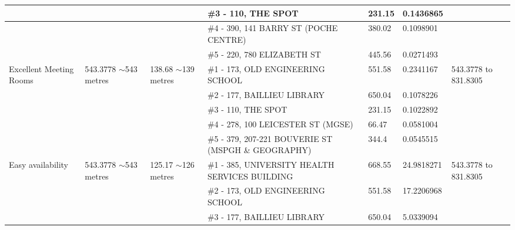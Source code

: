 \begin{table}[H]
{\begin{tabular}{|l|l|l|l|l|l|l|}
                        &                           &                          & \#3 - 110, THE SPOT                                     & 231.15        & 0.1436865       &                           \\ \hline
                        &                           &                          & \#4 - 390, 141 BARRY ST (POCHE CENTRE)                  & 380.02        & 0.1098901       &                           \\ \hline
                        &                           &                          & \#5 - 220, 780 ELIZABETH ST                             & 445.56        & 0.0271493       &                           \\ \hline
Excellent Meeting Rooms & 543.3778 $\sim$543 metres & 138.68 $\sim$139 metres  & \#1 - 173, OLD ENGINEERING SCHOOL                       & 551.58        & 0.2341167       & 543.3778 to 831.8305      \\ \hline
                        &                           &                          & \#2 - 177, BAILLIEU LIBRARY                             & 650.04        & 0.1078226       &                           \\ \hline
                        &                           &                          & \#3 - 110, THE SPOT                                     & 231.15        & 0.1022892       &                           \\ \hline
                        &                           &                          & \#4 - 278, 100 LEICESTER ST (MGSE)                      & 66.47         & 0.0581004       &                           \\ \hline
                        &                           &                          & \#5 - 379, 207-221 BOUVERIE ST (MSPGH \& GEOGRAPHY)     & 344.4         & 0.0545515       &                           \\ \hline
Easy availability       & 543.3778 $\sim$543 metres & 125.17 $\sim$126 metres  & \#1 - 385, UNIVERSITY HEALTH SERVICES BUILDING          & 668.55        & 24.9818271      & 543.3778 to 831.8305      \\ \hline
                        &                           &                          & \#2 - 173, OLD ENGINEERING SCHOOL                       & 551.58        & 17.2206968      &                           \\ \hline
                        &                           &                          & \#3 - 177, BAILLIEU LIBRARY                             & 650.04        & 5.0339094       &                           \\ \hline

\end{tabular}}
\end{table}
